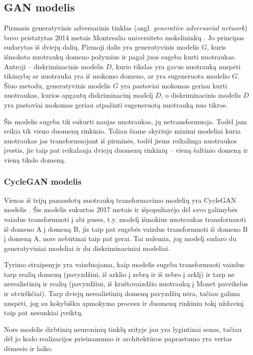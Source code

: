 \documentclass{VUMIFPSbakalaurinis}
\begin{document}
    \subsection{GAN modelis}
        Pirmasis generatyvinis adversarinis tinklas (angl. \emph{generative adversarial network}) buvo pristatytas 2014 metais Montrealio universiteto mokslininkų \cite{OrigGan}. Jo principas sudarytas iš dviejų dalių. Pirmoji dalis yra generatyvinis modelis $G$, kuris išmoksta nuotraukų domeno požymius ir pagal juos sugeba kurti nuotraukas. Antroji – diskriminacinis modelis $D$, kurio tikslas yra gavus nuotrauką nuspėti tikimybę ar nuotrauka yra iš mokomo domeno, ar yra sugeneruota modelio $G$. Šiuo metodu, generatyvinis modelis $G$ yra pastoviai mokomas geriau kurti nuotraukas, kurios apgautų diskriminacinį modelį $D$, o diskriminacinis modelis $D$ yra pastoviai mokomas geriau atpažinti sugeneruotą nuotrauką nuo tikros.

        Šis modelis sugeba tik sukurti naujas nuotraukas, jų netransformuoja. Todėl jam reikia tik vieno duomenų rinkinio. Toliau šiame skyriuje minimi modeliai kuria nuotraukas jas transformuojant iš pirminės, todėl jiems reikalinga nuotraukos įvestis, jie taip pat reikalauja dviejų duomenų rinkinių – vieną šaltinio domeną ir vieną tikslo domeną.
        \subsubsection{CycleGAN modelis}
            Vienas iš trijų panaudotų nuotraukų transformavimo modelių yra CycleGAN modelis \cite{CycleGAN2017}. Šis modelis sukurtas 2017 metais ir išpopuliarėjo dėl savo galimybės vaizdus transformuoti į abi puses, t.y. modelį išmokius nuotraukas transformuoti iš domeno A į domeną B, jis taip pat sugebės vaizdus transformuoti iš domeno B į domeną A, nors nebūtinai taip pat gerai. Tai nulemia, jog modelį sudaro du generatyviniai modeliai ir du diskriminaciniai modeliai.
    
            Tyrimo straipsnyje yra vaizduojama, kaip modelis sugeba transformuoti vaizdus tarp realių domenų (pavyzdžiui, iš arklio į zebrą ir iš zebro į arklį) ir tarp ne nerealistinių ir realių (pavyzdžiui, iš kraštovaizdžio nuotraukų į Monet paveikslus ir atvirškčiai). Tarp dviejų nerealistinių domenų pavyzdžių nėra, tačiau galima nuspėti, jog su kokybišku apmokymo procesu ir duomenų rinkiniu tokį uždavinį taip pat nesunkiai įveiktų.
    
            Nors modelis dirbtinių neuroninių tinklų srityje jau yra lygintinai  senas, tačiau dėl jo kodo realizacijos prieinamumo ir architektūros paprastumo yra vertas dėmesio ir laiko.
            
\end{document}
